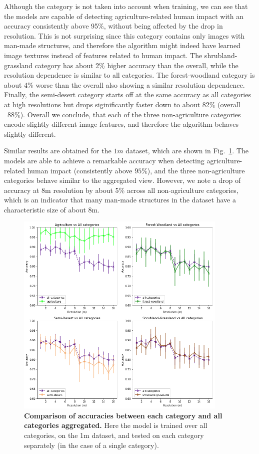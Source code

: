 Although the category is not taken into account when training, we can see that the models are capable of detecting agriculture-related human impact with an accuracy consistently above 95\%, without being affected by the drop in resolution. This is not surprising since this category contains only images with man-made structures, and therefore the algorithm might indeed have learned image textures instead of features related to human impact.
The shrubland-grassland category has about 2\% higher accuracy than the overall, while the resolution dependence is similar to all categories. The forest-woodland category is  about 4\% worse than the overall also showing a similar resolution dependence. Finally, the semi-desert category starts off at the same accuracy as all categories at high resolutions but drops siginificantly faster down to about 82\% (overall ~88\%). Overall we conclude, that each of the three non-agriculture categories encode slightly different image features, and therefore the algorithm behaves slightly different.

Similar results are obtained for the $1m$ dataset, which are shown in Fig.~\ref{fig:acc_by_cat_1m}. The models are able to achieve a remarkable accuracy when detecting agriculture-related human impact (consistently above $95\%$), and the three non-agriculture categories behave similar to the aggregated view. However, we note a drop of accuracy at 8m resolution by about 5\% across all non-agriculture categories, which is an indicator that many man-made structures in the dataset have a characteristic size of  about 8m.

\begin{figure}[H]
	\centering
	\includegraphics[width=0.9\textwidth]{Figures/results/acc_res_by_category_1m.png}
	\captionsetup{width=1\linewidth}
	\caption{\textbf{Comparison of accuracies between each category and all categories aggregated.} Here the model is trained over all categories, on the 1m dataset, and tested on each category separately (in the case of a single category).}
	\label{fig:acc_by_cat_1m}
\end{figure}


